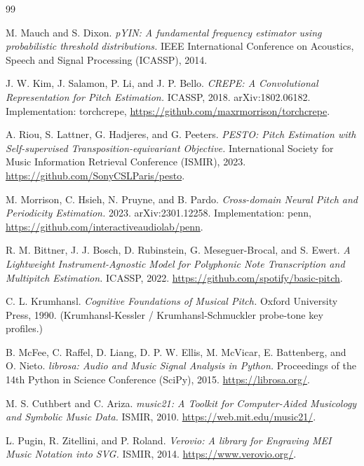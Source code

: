 \documentclass[12pt,a4paper]{article}
\begin{document}
\newpage
{}
\begin{thebibliography}{99}

 M. Mauch and S. Dixon. \emph{pYIN: A fundamental frequency
estimator using probabilistic threshold distributions.} IEEE International
Conference on Acoustics, Speech and Signal Processing (ICASSP), 2014.

 J. W. Kim, J. Salamon, P. Li, and J. P. Bello. \emph{CREPE: A
Convolutional Representation for Pitch Estimation.} ICASSP, 2018.
arXiv:1802.06182. Implementation: torchcrepe,
\url{https://github.com/maxrmorrison/torchcrepe}.

 A. Riou, S. Lattner, G. Hadjeres, and G. Peeters. \emph{PESTO:
Pitch Estimation with Self-supervised Transposition-equivariant Objective.}
International Society for Music Information Retrieval Conference (ISMIR), 2023.
\url{https://github.com/SonyCSLParis/pesto}.

 M. Morrison, C. Hsieh, N. Pruyne, and B. Pardo.
\emph{Cross-domain Neural Pitch and Periodicity Estimation.} 2023.
arXiv:2301.12258. Implementation: penn,
\url{https://github.com/interactiveaudiolab/penn}.

 R. M. Bittner, J. J. Bosch, D. Rubinstein,
G. Meseguer-Brocal, and S. Ewert. \emph{A Lightweight Instrument-Agnostic Model
for Polyphonic Note Transcription and Multipitch Estimation.} ICASSP, 2022.
\url{https://github.com/spotify/basic-pitch}.

 C. L. Krumhansl. \emph{Cognitive Foundations of Musical
Pitch.} Oxford University Press, 1990. (Krumhansl-Kessler / Krumhansl-Schmuckler
probe-tone key profiles.)

 B. McFee, C. Raffel, D. Liang, D. P. W. Ellis, M. McVicar,
E. Battenberg, and O. Nieto. \emph{librosa: Audio and Music Signal Analysis in
Python.} Proceedings of the 14th Python in Science Conference (SciPy), 2015.
\url{https://librosa.org/}.

 M. S. Cuthbert and C. Ariza. \emph{music21: A Toolkit for
Computer-Aided Musicology and Symbolic Music Data.} ISMIR, 2010.
\url{https://web.mit.edu/music21/}.

 L. Pugin, R. Zitellini, and P. Roland. \emph{Verovio: A
library for Engraving MEI Music Notation into SVG.} ISMIR, 2014.
\url{https://www.verovio.org/}.


\end{thebibliography}
\end{document}
